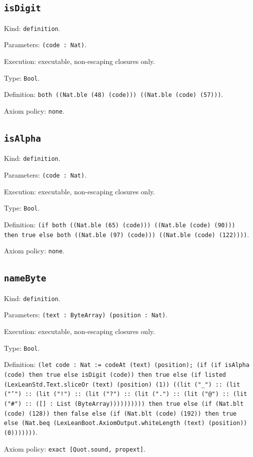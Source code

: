 \documentclass[11pt]{article}
\begin{document}
\subsection*{\texttt{isDigit}}
\noindent Kind: \texttt{definition}.\par
\noindent Parameters: \texttt{(code : Nat)}.\par
\noindent Execution: executable, non-escaping closures only.\par
\noindent Type: \texttt{Bool}.\par
\noindent Definition: \texttt{both ((Nat.ble (48) (code))) ((Nat.ble (code) (57)))}.\par
\noindent Axiom policy: \texttt{none}.\par
\subsection*{\texttt{isAlpha}}
\noindent Kind: \texttt{definition}.\par
\noindent Parameters: \texttt{(code : Nat)}.\par
\noindent Execution: executable, non-escaping closures only.\par
\noindent Type: \texttt{Bool}.\par
\noindent Definition: \texttt{(if both ((Nat.ble (65) (code))) ((Nat.ble (code) (90))) then true else both ((Nat.ble (97) (code))) ((Nat.ble (code) (122))))}.\par
\noindent Axiom policy: \texttt{none}.\par
\subsection*{\texttt{nameByte}}
\noindent Kind: \texttt{definition}.\par
\noindent Parameters: \texttt{(text : ByteArray) (position : Nat)}.\par
\noindent Execution: executable, non-escaping closures only.\par
\noindent Type: \texttt{Bool}.\par
\noindent Definition: \texttt{(let code : Nat := codeAt (text) (position); (if (if isAlpha (code) then true else isDigit (code)) then true else (if listed (LexLeanStd.Text.sliceOr (text) (position) (1)) ((lit ("\_") :: (lit ("'") :: (lit ("!") :: (lit ("?") :: (lit (".") :: (lit ("@") :: (lit ("\#") :: ([] : List (ByteArray)))))))))) then true else (if (Nat.blt (code) (128)) then false else (if (Nat.blt (code) (192)) then true else (Nat.beq (LexLeanBoot.AxiomOutput.whiteLength (text) (position)) (0)))))))}.\par
\noindent Axiom policy: \texttt{exact [Quot.sound, propext]}.\par
\end{document}
